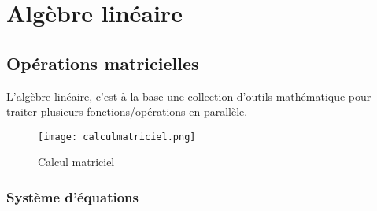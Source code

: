 \chapter{Algèbre linéaire}

\section{Opérations matricielles}
\label{sec:opmat}

L'algèbre linéaire, c'est à la base une collection d'outils mathématique pour traiter plusieurs fonctions/opérations en parallèle. 

\begin{figure}[htbp]
	\centering
		\texttt{[image: calculmatriciel.png]}
	\caption{Calcul matriciel }
	\label{fig:calculmatriciel}
\end{figure}


\subsection{Système d’équations}
\label{sec:syseq}

